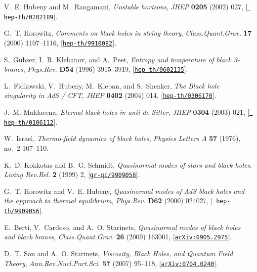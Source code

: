 \documentclass[12pt]{article}
\begin{document}
\begin{thebibliography}{100}
V.~E. Hubeny and M.~Rangamani, {\it {Unstable horizons}},  {\em JHEP} {\bf
  0205} (2002) 027, [\href{http://xxx.lanl.gov/abs/hep-th/0202189}{{\tt
  hep-th/0202189}}].

G.~T. Horowitz, {\it {Comments on black holes in string theory}},  {\em
  Class.Quant.Grav.} {\bf 17} (2000) 1107--1116,
  [\href{http://xxx.lanl.gov/abs/hep-th/9910082}{{\tt hep-th/9910082}}].

S.~Gubser, I.~R. Klebanov, and A.~Peet, {\it {Entropy and temperature of black
  3-branes}},  {\em Phys.Rev.} {\bf D54} (1996) 3915--3919,
  [\href{http://xxx.lanl.gov/abs/hep-th/9602135}{{\tt hep-th/9602135}}].

L.~Fidkowski, V.~Hubeny, M.~Kleban, and S.~Shenker, {\it {The Black hole
  singularity in AdS / CFT}},  {\em JHEP} {\bf 0402} (2004) 014,
  [\href{http://xxx.lanl.gov/abs/hep-th/0306170}{{\tt hep-th/0306170}}].

J.~M. Maldacena, {\it {Eternal black holes in anti-de Sitter}},  {\em JHEP}
  {\bf 0304} (2003) 021, [\href{http://xxx.lanl.gov/abs/hep-th/0106112}{{\tt
  hep-th/0106112}}].

W.~Israel, {\it Thermo-field dynamics of black holes},  {\em Physics Letters A}
  {\bf 57} (1976), no.~2 107--110.

K.~D. Kokkotas and B.~G. Schmidt, {\it {Quasinormal modes of stars and black
  holes}},  {\em Living Rev.Rel.} {\bf 2} (1999) 2,
  [\href{http://xxx.lanl.gov/abs/gr-qc/9909058}{{\tt gr-qc/9909058}}].

G.~T. Horowitz and V.~E. Hubeny, {\it {Quasinormal modes of AdS black holes and
  the approach to thermal equilibrium}},  {\em Phys.Rev.} {\bf D62} (2000)
  024027, [\href{http://xxx.lanl.gov/abs/hep-th/9909056}{{\tt
  hep-th/9909056}}].

E.~Berti, V.~Cardoso, and A.~O. Starinets, {\it {Quasinormal modes of black
  holes and black branes}},  {\em Class.Quant.Grav.} {\bf 26} (2009) 163001,
  [\href{http://xxx.lanl.gov/abs/0905.2975}{{\tt arXiv:0905.2975}}].

D.~T. Son and A.~O. Starinets, {\it {Viscosity, Black Holes, and Quantum Field
  Theory}},  {\em Ann.Rev.Nucl.Part.Sci.} {\bf 57} (2007) 95--118,
  [\href{http://xxx.lanl.gov/abs/0704.0240}{{\tt arXiv:0704.0240}}].


\end{thebibliography}
\end{document}
